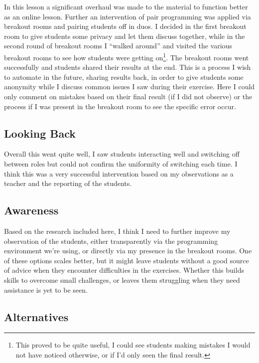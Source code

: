 \documentclass[paper=a4,justified,a4paper]{tufte-handout}
\begin{document}
In this lesson a significant overhaul was made to the material to
function better as an online lesson. Further an intervention of pair
programming was applied via breakout rooms and pairing students off in
duos. I decided in the first breakout room to give students some privacy
and let them discuss together, while in the second round of breakout
rooms I ``walked around'' and visited the various breakout rooms to see
how students were getting on\footnote{This proved to be quite useful, I
  could see students making mistakes I would not have noticed otherwise,
  or if I'd only seen the final result.}. The breakout rooms went
successfully and students shared their results at the end. This is a
process I wish to automate in the future, sharing results back, in order
to give students some anonymity while I discuss common issues I saw
during their exercise. Here I could only comment on mistakes based on
their final result (if I did not observe) or the process if I was
present in the breakout room to see the specific error occur.

\hypertarget{looking-back}{%
\subsection{Looking Back}\label{looking-back}}

Overall this went quite well, I saw students interacting well and
switching off between roles but could not confirm the uniformity of
switching each time. I think this was a very successful intervention
based on my observations as a teacher and the reporting of the students.

\hypertarget{awareness}{%
\subsection{Awareness}\label{awareness}}

Based on the research included here, I think I need to further improve
my observation of the students, either transparently via the programming
environment we're using, or directly via my presence in the breakout
rooms. One of these options scales better, but it might leave students
without a good source of advice when they encounter difficulties in the
exercises. Whether this builds skills to overcome small challenges, or
leaves them struggling when they need assistance is yet to be seen.

\hypertarget{alternatives}{%
\subsection{Alternatives}\label{alternatives}}
\end{document}
